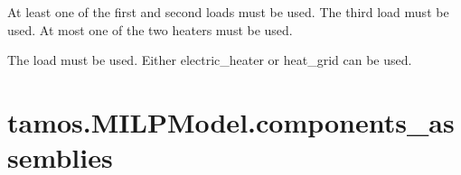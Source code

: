 \documentclass[letterpaper,10pt,english]{sphinxmanual}
\begin{document}
\begin{fulllineitems}
\sphinxAtStartPar
At least one of the first and second loads must be used.
The third load must be used. At most one of the two heaters must be used.

\begin{sphinxVerbatim}[commandchars=\\\{\}]
  \PYG{p}{[}  \PYG{p}{[} \PYG{p}{]}   \PYG{p}{]}
\end{sphinxVerbatim}

\sphinxAtStartPar
The load must be used. Either electric\_heater or heat\_grid can be used.

\end{fulllineitems}


\sphinxstepscope


\section{tamos.MILPModel.components\_assemblies}
\label{\detokenize{generated/tamos.MILPModel.components_assemblies:tamos-milpmodel-components-assemblies}}\label{\detokenize{generated/tamos.MILPModel.components_assemblies::doc}}
\end{document}
